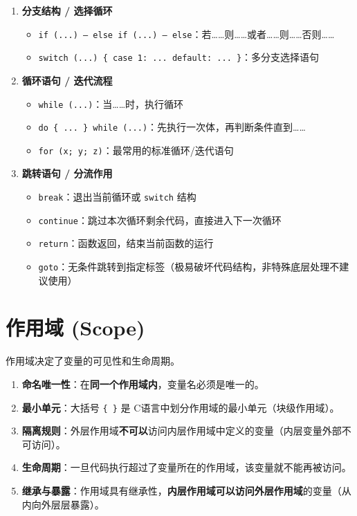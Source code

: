 \begin{enumerate}
    \item \textbf{分支结构 / 选择循环}
    \begin{itemize}
        \item \texttt{if (...) -- else if (...) -- else}：若……则……或者……则……否则……
        \item \texttt{switch (...) \{ case 1: ... default: ... \}}：多分支选择语句
    \end{itemize}

    \item \textbf{循环语句 / 迭代流程}
    \begin{itemize}
        \item \texttt{while (...)}：当……时，执行循环
        \item \texttt{do \{ ... \} while (...)}：先执行一次体，再判断条件直到……
        \item \texttt{for (x; y; z)}：最常用的标准循环/迭代语句
    \end{itemize}

    \item \textbf{跳转语句 / 分流作用}
    \begin{itemize}
        \item \texttt{break}：退出当前循环或 \texttt{switch} 结构
        \item \texttt{continue}：跳过本次循环剩余代码，直接进入下一次循环
        \item \texttt{return}：函数返回，结束当前函数的运行
        \item \texttt{goto}：无条件跳转到指定标签（极易破坏代码结构，非特殊底层处理不建议使用）
    \end{itemize}
\end{enumerate}

\section{作用域 (Scope)}

作用域决定了变量的可见性和生命周期。

\begin{enumerate}
    \item \textbf{命名唯一性}：在\textbf{同一个作用域内}，变量名必须是唯一的。
    \item \textbf{最小单元}：大括号 \texttt{\{ \}} 是 C语言中划分作用域的最小单元（块级作用域）。
    \item \textbf{隔离规则}：外层作用域\textbf{不可以}访问内层作用域中定义的变量（内层变量外部不可访问）。
    \item \textbf{生命周期}：一旦代码执行超过了变量所在的作用域，该变量就不能再被访问。
    \item \textbf{继承与暴露}：作用域具有继承性，\textbf{内层作用域可以访问外层作用域}的变量（从内向外层层暴露）。
\end{enumerate}

